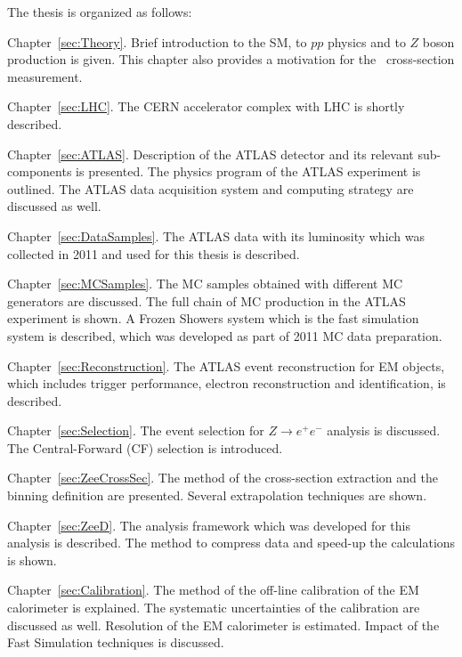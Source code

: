 The thesis is organized as follows:
\begin{description}
\item Chapter~\ref{sec:Theory}. Brief introduction to the SM, to $pp$ physics and to $Z$ boson production is given. This chapter also provides a motivation for the \Zee\ cross-section measurement.

\item Chapter~\ref{sec:LHC}. The CERN accelerator complex with LHC is shortly described.

\item Chapter~\ref{sec:ATLAS}. Description of the ATLAS detector and its relevant sub-components is presented. The physics program of the ATLAS experiment is outlined. The ATLAS data acquisition system and computing strategy are discussed as well.

\item Chapter~\ref{sec:DataSamples}. The ATLAS data with its luminosity which was collected in 2011 and used for this thesis is described.

\item Chapter~\ref{sec:MCSamples}. The MC samples obtained with different MC generators are discussed. The full chain of MC production in the ATLAS experiment is shown. A Frozen Showers system which is the fast simulation system is described, which was developed as part of 2011 MC data preparation.

\item Chapter~\ref{sec:Reconstruction}. The ATLAS event reconstruction for EM objects, which includes trigger performance, electron reconstruction and identification, is described.

\item Chapter~\ref{sec:Selection}. The event selection for $Z \to e^+e^-$ analysis is discussed. The Central-Forward (CF) selection is introduced.

\item Chapter~\ref{sec:ZeeCrossSec}. The method of the cross-section extraction and the binning definition are presented. Several extrapolation techniques are shown.

\item Chapter~\ref{sec:ZeeD}. The analysis framework which was developed for this analysis is described. The method to compress data and speed-up the calculations is shown.

\item Chapter~\ref{sec:Calibration}. The method of the off-line calibration of the EM calorimeter is explained. The systematic uncertainties of the calibration are discussed as well. Resolution of the EM calorimeter is estimated. Impact of the Fast Simulation techniques is discussed.


\end{description}
